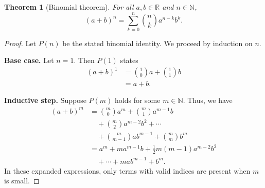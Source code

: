 \documentclass[11pt]{article}
\newtheorem{theorem}{Theorem}
\begin{document}
\begin{theorem}[Binomial theorem]
For all \(a,b\in\mathbb{R}\) and \(n\in\mathbb{N}\),
\[
(a+b)^n=\sum_{k=0}^{n}\binom{n}{k}a^{n-k}b^k.
\]
\end{theorem}

\begin{proof}
Let \(P(n)\) be the stated binomial identity.
We proceed by induction on \(n\).

\textbf{Base case.} Let \(n=1\).
Then \(P(1)\) states
\begin{align*}
(a+b)^1
&=\binom{1}{0}a+\binom{1}{1}b\\
&=a+b.
\end{align*}

\textbf{Inductive step.} Suppose \(P(m)\) holds for some \(m\in\mathbb{N}\).
Thus, we have
\begin{align*}
(a+b)^m
&=\binom{m}{0}a^m+\binom{m}{1}a^{m-1}b\\
&\quad+\binom{m}{2}a^{m-2}b^2+\cdots\\
&\quad+\binom{m}{m-1}ab^{m-1}+\binom{m}{m}b^m\\
&=a^m+ma^{m-1}b+\frac12m(m-1)a^{m-2}b^2\\
&\quad+\cdots+mab^{m-1}+b^m.
\end{align*}
In these expanded expressions, only terms with valid indices are present when \(m\) is small.


\end{proof}
\end{document}

